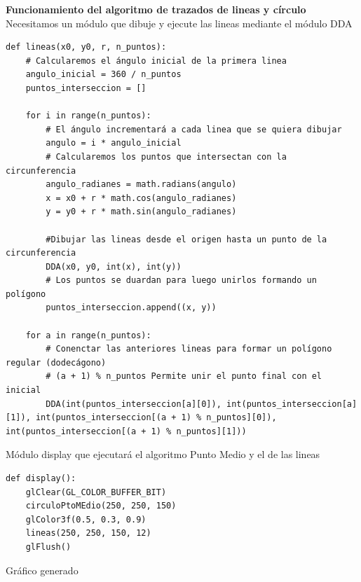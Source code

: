 \documentclass[a4paper]{article}
\begin{document}
\Large{\textbf{Funcionamiento del algoritmo de trazados de lineas y círculo}}\\[0.5cm]
Necesitamos un módulo que dibuje y ejecute las lineas mediante el módulo DDA 
\begin{center}
\begin{mycodeboxl}
\begin{lstlisting}
def lineas(x0, y0, r, n_puntos):
    # Calcularemos el ángulo inicial de la primera linea
    angulo_inicial = 360 / n_puntos
    puntos_interseccion = []

    for i in range(n_puntos):
        # El ángulo incrementará a cada linea que se quiera dibujar 
        angulo = i * angulo_inicial
        # Calcularemos los puntos que intersectan con la circunferencia
        angulo_radianes = math.radians(angulo)
        x = x0 + r * math.cos(angulo_radianes)
        y = y0 + r * math.sin(angulo_radianes)

        #Dibujar las lineas desde el origen hasta un punto de la circunferencia
        DDA(x0, y0, int(x), int(y)) 
        # Los puntos se duardan para luego unirlos formando un polígono
        puntos_interseccion.append((x, y))

    for a in range(n_puntos):
        # Conenctar las anteriores lineas para formar un polígono regular (dodecágono) 
        # (a + 1) % n_puntos Permite unir el punto final con el inicial
        DDA(int(puntos_interseccion[a][0]), int(puntos_interseccion[a][1]), int(puntos_interseccion[(a + 1) % n_puntos][0]), int(puntos_interseccion[(a + 1) % n_puntos][1]))
\end{lstlisting}
\end{mycodeboxl}
\end{center}
\newpage
Módulo display que ejecutará el algoritmo Punto Medio y el de las lineas
\begin{center}
\begin{mycodebox}
\begin{lstlisting}
def display():
    glClear(GL_COLOR_BUFFER_BIT)
    circuloPtoMEdio(250, 250, 150)
    glColor3f(0.5, 0.3, 0.9) 
    lineas(250, 250, 150, 12)
    glFlush()
\end{lstlisting}
\end{mycodebox}
\end{center}
Gráfico generado
\end{document}
